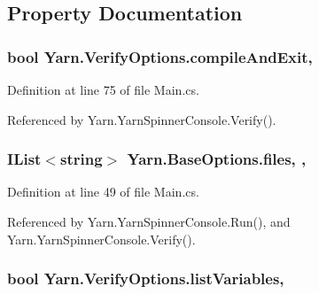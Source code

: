 \subsection{Property Documentation}
\hypertarget{a00171_af9b6917244075618720f2a90bbe6ef56}{
\subsubsection[{compile\-And\-Exit}]{\setlength{\rightskip}{0pt plus 5cm}bool Yarn.\-Verify\-Options.\-compile\-And\-Exit\hspace{0.3cm}{\ttfamily [get]}, {\ttfamily [set]}}}\label{a00171_af9b6917244075618720f2a90bbe6ef56}


Definition at line 75 of file Main.\-cs.



Referenced by Yarn.\-Yarn\-Spinner\-Console.\-Verify().

\hypertarget{a00042_aa93cbb1bc1d5328e0a417012621e92d2}{
\subsubsection[{files}]{\setlength{\rightskip}{0pt plus 5cm}I\-List$<$string$>$ Yarn.\-Base\-Options.\-files\hspace{0.3cm}{\ttfamily [get]}, {\ttfamily [set]}, {\ttfamily [inherited]}}}\label{a00042_aa93cbb1bc1d5328e0a417012621e92d2}


Definition at line 49 of file Main.\-cs.



Referenced by Yarn.\-Yarn\-Spinner\-Console.\-Run(), and Yarn.\-Yarn\-Spinner\-Console.\-Verify().

\hypertarget{a00171_a062775744f2d7144527fa3bca4b9b3ce}{
\subsubsection[{list\-Variables}]{\setlength{\rightskip}{0pt plus 5cm}bool Yarn.\-Verify\-Options.\-list\-Variables\hspace{0.3cm}{\ttfamily [get]}, {\ttfamily [set]}}}\label{a00171_a062775744f2d7144527fa3bca4b9b3ce}


